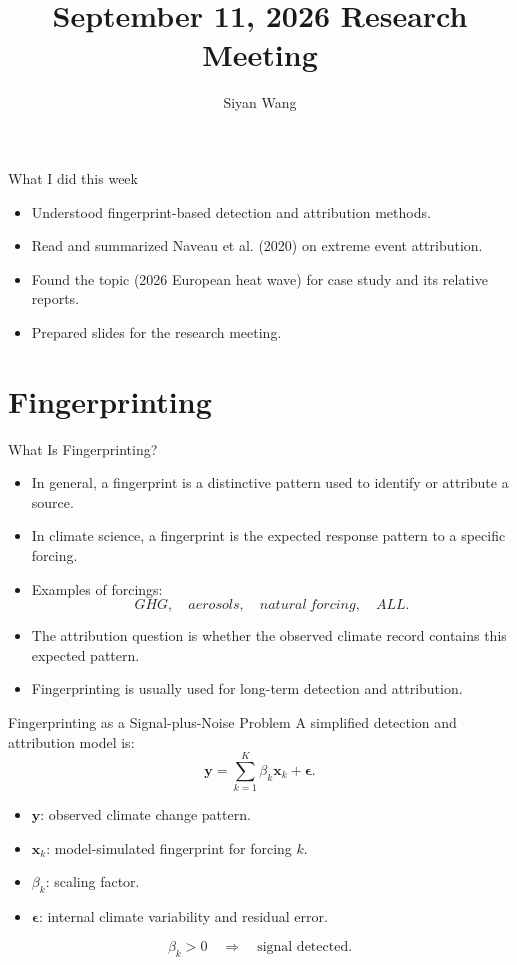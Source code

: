 \documentclass[aspectratio=169]{beamer}
\title[Research Meeting]{September 11, 2026 Research Meeting}
\subtitle{}
\author{Siyan Wang}
\date{}
\begin{document}
\begin{frame}
  \titlepage
\end{frame}

\begin{frame}{What I did this week}
  \begin{itemize}
    \item Understood fingerprint-based detection and attribution methods.
    \item Read and summarized Naveau et al. (2020) on extreme event attribution.
    \item Found the topic (2026 European heat wave) for case study and its relative reports.
    \item Prepared slides for the research meeting.
  \end{itemize}
  
\end{frame}


\section{Fingerprinting}

\begin{frame}[plain]
  \sectionpage
\end{frame}

\begin{frame}{What Is Fingerprinting?}
\small
\begin{itemize}
  \item In general, a fingerprint is a distinctive pattern used to identify or attribute a source.
  \item In climate science, a fingerprint is the expected response pattern to a specific forcing.
  \item Examples of forcings:
  \[
    GHG,\quad aerosols,\quad natural\ forcing,\quad ALL.
  \]
  \item The attribution question is whether the observed climate record contains this expected pattern.
  \item Fingerprinting is usually used for long-term detection and attribution.
\end{itemize}
\end{frame}

\begin{frame}{Fingerprinting as a Signal-plus-Noise Problem}
\small
A simplified detection and attribution model is:
\[
  \mathbf{y}
  =
  \sum_{k=1}^{K} \beta_k \mathbf{x}_k
  +
  \boldsymbol{\epsilon}.
\]

\begin{itemize}
  \item $\mathbf{y}$: observed climate change pattern.
  \item $\mathbf{x}_k$: model-simulated fingerprint for forcing $k$.
  \item $\beta_k$: scaling factor.
  \item $\boldsymbol{\epsilon}$: internal climate variability and residual error.
\end{itemize}

\[
  \beta_k > 0
  \quad \Rightarrow \quad
  \text{signal detected.}
\]
\end{frame}
\end{document}
